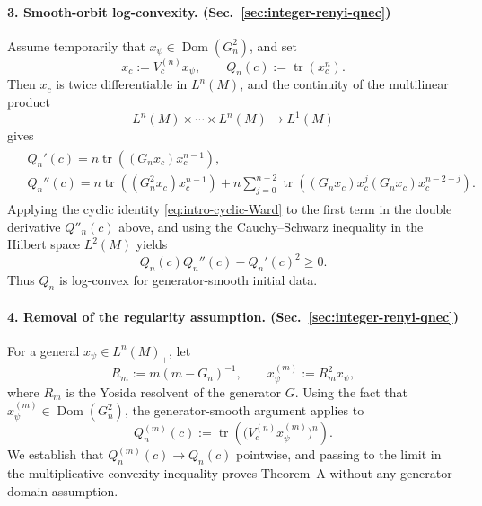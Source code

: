 \documentclass[11pt,a4paper]{article}
\theoremstyle{plain}
\numberwithin{theorem}{section}
\theoremstyle{definition}
\newcommand{\?}{\overset{?}{=}}
\DeclareMathOperator{\tr}{tr}
\DeclareMathOperator{\Dom}{Dom}
\begin{document}
\paragraph*{3. Smooth-orbit log-convexity. (Sec.~\ref{sec:integer-renyi-qnec})}
Assume temporarily that \(x_\psi\in\operatorname{Dom}(G_n^2)\), and set
\[
        x_c:=V_c^{(n)}x_\psi,
        \qquad
        Q_n(c):=\tr(x_c^n).
\]
Then \(x_c\) is twice differentiable in \(L^n(M)\), and the continuity of
the multilinear product
\[
        L^n(M)\times\cdots\times L^n(M)
        \longrightarrow
        L^1(M)
\]
gives
\begin{align}\label{eq:derivatives}
\begin{aligned}
        &Q_n'(c)=
        n\tr\left((G_nx_c)x_c^{n-1}\right),\\
        &Q_n''(c)=
        n\tr\left((G_n^2x_c)x_c^{n-1}\right)
        +
        n\sum_{j=0}^{n-2}
        \tr\left(
        (G_nx_c)x_c^j
        (G_nx_c)x_c^{n-2-j}
        \right).
\end{aligned}
\end{align}
Applying the cyclic identity \eqref{eq:intro-cyclic-Ward} to the first term in the double derivative $Q''_n(c)$ above, and using the Cauchy--Schwarz inequality in the Hilbert space \(L^2(M)\)
yields
\begin{equation}
        Q_n(c)Q_n''(c)-Q_n'(c)^2\geq0.
\end{equation}
Thus \(Q_n\) is log-convex for generator-smooth initial data.

\paragraph*{4. Removal of the regularity assumption. (Sec.~\ref{sec:integer-renyi-qnec})}
For a general \(x_\psi\in L^n(M)_+\), let
\begin{equation}
        R_m:=m(m-G_n)^{-1},
        \qquad
        x_\psi^{(m)}:=R_m^2x_\psi,
\end{equation}
where $R_m$ is the Yosida resolvent of the generator $G$. Using the fact that $x_\psi^{(m)}\in \Dom(G_n^2)$, the generator-smooth argument applies to 
\[
        Q_n^{(m)}(c)
        :=
        \tr\left(
        \bigl(V_c^{(n)}x_\psi^{(m)}\bigr)^n
        \right).
\]
We establish that \(Q_n^{(m)}(c)\to Q_n(c)\) pointwise, and passing to the limit in
the multiplicative convexity inequality proves Theorem~A without any
generator-domain assumption.
\end{document}
